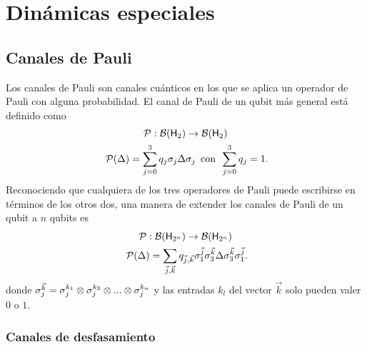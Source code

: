 \section{Dinámicas especiales}

\subsection{Canales de Pauli}
\label{subsec:PauliChannels}

Los canales de Pauli son canales cuánticos en los que se aplica un operador de Pauli con alguna probabilidad. El canal de Pauli de un qubit más general está definido como
\begin{gather}
    \mcP:\mcB(\hilbert_{2}) \rightarrow \mcB(\hilbert_{2})\nonumber\\
    \mcP(\Delta)=\sum_{j=0}^{3}q_{j}\pauli{j}\Delta\pauli{j}\,\text{ con }\, \sum_{j=0}^{3}q_{j}=1\rlap{.}\nonumber
\end{gather}
Reconociendo que cualquiera de los tres operadores de Pauli puede escribirse en términos de los otros dos, una manera de extender los canales de Pauli de un qubit a $n$ qubits es \cite{NPauliOperators}
\begin{equation}\label{eq:PauliChannelN}
    \begin{gathered}
        \mcP:\mcB(\hilbert_{2^{n}}) \rightarrow \mcB(\hilbert_{2^{n}})\\
        \mcP(\Delta)=\sum_{\vec{j},\vec{k}}q_{\vec{j},\vec{k}}\pauli{1}^{\vec{j}}\pauli{3}^{\vec{k}}\Delta\pauli{3}^{\vec{k}}\pauli{1}^{\vec{j}}\rlap{.}
    \end{gathered}
\end{equation}
donde $\sigma_{j}^{\vec{k}}=\sigma_{j}^{k_{1}}\otimes\sigma_{j}^{k_{2}}\otimes ... \otimes \sigma_{j}^{k_{n}}$ y las entradas $k_{l}$ del vector $\vec{k}$ solo pueden valer $0$ o $1$.

\subsubsection{Canales de desfasamiento}

